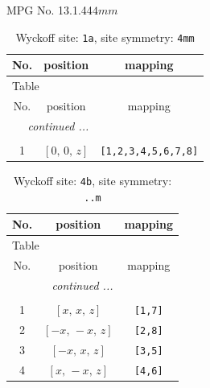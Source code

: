 \documentclass[fleqn,8pt]{jsarticle}
\begin{document}
\setcounter{MaxMatrixCols}{32}

\renewcommand{\tablename}{Table~}
\renewcommand{\figurename}{Figure~}
\begin{center}
\LARGE
MPG No. 13.1.44\quad$4mm$
\end{center}
\renewcommand{\arraystretch}{1.2}
\begin{longtable}{ccc}
\caption{Wyckoff site: {\tt 1a}, site symmetry: {\tt 4mm}}
 \\
 \hline \hline
No. & position & mapping \\ \hline \endfirsthead

\multicolumn{2}{l}{\tablename\ \thetable{}} \\
 \hline \hline
No. & position & mapping \\ \hline \endhead

 \hline \hline
\multicolumn{2}{r}{\footnotesize\it continued ...} \\ \endfoot

 \hline \hline
\multicolumn{2}{r}{} \\ \endlastfoot

1 & $\left[ 0,\, 0,\, z \right]$ & {\tt [1,2,3,4,5,6,7,8]} \\
\end{longtable}
\renewcommand{\arraystretch}{1.2}
\begin{longtable}{ccc}
\caption{Wyckoff site: {\tt 4b}, site symmetry: {\tt ..m}}
 \\
 \hline \hline
No. & position & mapping \\ \hline \endfirsthead

\multicolumn{2}{l}{\tablename\ \thetable{}} \\
 \hline \hline
No. & position & mapping \\ \hline \endhead

 \hline \hline
\multicolumn{2}{r}{\footnotesize\it continued ...} \\ \endfoot

 \hline \hline
\multicolumn{2}{r}{} \\ \endlastfoot

1 & $\left[ x,\, x,\, z \right]$ & {\tt [1,7]} \\ \hline
2 & $\left[ - x,\, - x,\, z \right]$ & {\tt [2,8]} \\ \hline
3 & $\left[ - x,\, x,\, z \right]$ & {\tt [3,5]} \\ \hline
4 & $\left[ x,\, - x,\, z \right]$ & {\tt [4,6]} \\
\end{longtable}
\end{document}
